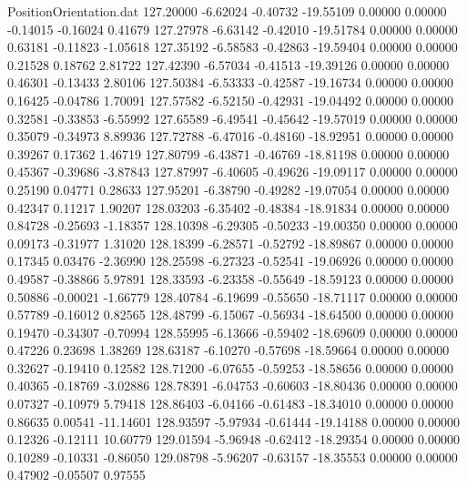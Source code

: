 \begin{filecontents}{PositionOrientation.dat}
 127.20000   -6.62024   -0.40732   -19.55109    0.00000    0.00000   -0.14015   -0.16024    0.41679
 127.27978   -6.63142   -0.42010   -19.51784    0.00000    0.00000    0.63181   -0.11823   -1.05618
 127.35192   -6.58583   -0.42863   -19.59404    0.00000    0.00000    0.21528    0.18762    2.81722
 127.42390   -6.57034   -0.41513   -19.39126    0.00000    0.00000    0.46301   -0.13433    2.80106
 127.50384   -6.53333   -0.42587   -19.16734    0.00000    0.00000    0.16425   -0.04786    1.70091
 127.57582   -6.52150   -0.42931   -19.04492    0.00000    0.00000    0.32581   -0.33853   -6.55992
 127.65589   -6.49541   -0.45642   -19.57019    0.00000    0.00000    0.35079   -0.34973    8.89936
 127.72788   -6.47016   -0.48160   -18.92951    0.00000    0.00000    0.39267    0.17362    1.46719
 127.80799   -6.43871   -0.46769   -18.81198    0.00000    0.00000    0.45367   -0.39686   -3.87843
 127.87997   -6.40605   -0.49626   -19.09117    0.00000    0.00000    0.25190    0.04771    0.28633
 127.95201   -6.38790   -0.49282   -19.07054    0.00000    0.00000    0.42347    0.11217    1.90207
 128.03203   -6.35402   -0.48384   -18.91834    0.00000    0.00000    0.84728   -0.25693   -1.18357
 128.10398   -6.29305   -0.50233   -19.00350    0.00000    0.00000    0.09173   -0.31977    1.31020
 128.18399   -6.28571   -0.52792   -18.89867    0.00000    0.00000    0.17345    0.03476   -2.36990
 128.25598   -6.27323   -0.52541   -19.06926    0.00000    0.00000    0.49587   -0.38866    5.97891
 128.33593   -6.23358   -0.55649   -18.59123    0.00000    0.00000    0.50886   -0.00021   -1.66779
 128.40784   -6.19699   -0.55650   -18.71117    0.00000    0.00000    0.57789   -0.16012    0.82565
 128.48799   -6.15067   -0.56934   -18.64500    0.00000    0.00000    0.19470   -0.34307   -0.70994
 128.55995   -6.13666   -0.59402   -18.69609    0.00000    0.00000    0.47226    0.23698    1.38269
 128.63187   -6.10270   -0.57698   -18.59664    0.00000    0.00000    0.32627   -0.19410    0.12582
 128.71200   -6.07655   -0.59253   -18.58656    0.00000    0.00000    0.40365   -0.18769   -3.02886
 128.78391   -6.04753   -0.60603   -18.80436    0.00000    0.00000    0.07327   -0.10979    5.79418
 128.86403   -6.04166   -0.61483   -18.34010    0.00000    0.00000    0.86635    0.00541  -11.14601
 128.93597   -5.97934   -0.61444   -19.14188    0.00000    0.00000    0.12326   -0.12111   10.60779
 129.01594   -5.96948   -0.62412   -18.29354    0.00000    0.00000    0.10289   -0.10331   -0.86050
 129.08798   -5.96207   -0.63157   -18.35553    0.00000    0.00000    0.47902   -0.05507    0.97555

\end{filecontents}
